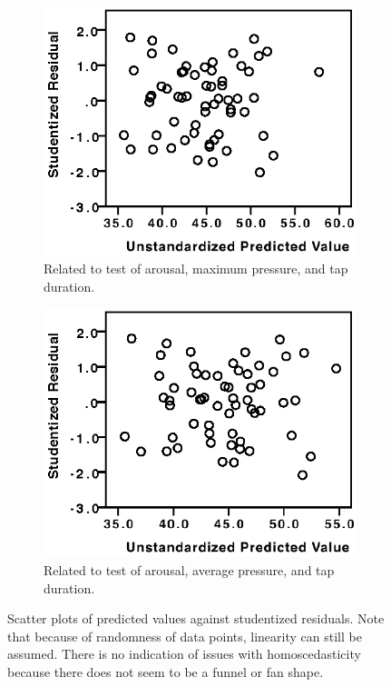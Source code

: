 \begin{figure}[h]
\begin{subfigure}[b]{0.45\textwidth}
    \label{fig:valence_avg}
\end{subfigure}
\par\bigskip
\par\bigskip
\begin{subfigure}[b]{0.45\textwidth}
    \centering
    \includegraphics[width=\textwidth]{images/linearity/ArMax.eps}
    \caption{Related to test of arousal, maximum pressure, and tap duration.}
    \label{fig:arousal_maximum}
\end{subfigure}
\quad
\begin{subfigure}[b]{0.45\textwidth}
    \centering
    \includegraphics[width=\textwidth]{images/linearity/ArAvg.eps}
    \caption{Related to test of arousal, average pressure, and tap duration.}
    \label{fig:arousal_avg}
\end{subfigure}
\caption{Scatter plots of predicted values against studentized residuals. Note that because of randomness of data points, linearity can still be assumed. There is no indication of issues with homoscedasticity because there does not seem to be a funnel or fan shape.}
\end{figure}